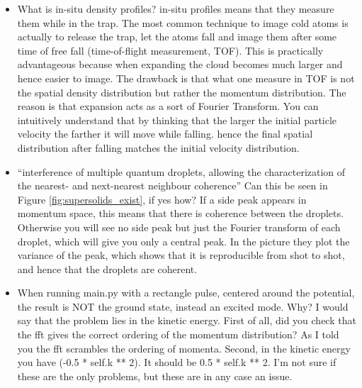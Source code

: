 \begin{itemize}
    \item What is in-situ density profiles?
    {\color{red}
        in-situ profiles means that they measure them while in the trap.
        The most common technique to image cold atoms is actually to release the trap,
        let the atoms fall and image them after some time of free fall (time-of-flight measurement, TOF).
        This is practically advantageous because when expanding the cloud becomes much larger and hence easier to image.
        The drawback is that what one measure in TOF is not the spatial density distribution but rather
        the momentum distribution. The reason is that expansion acts as a sort of Fourier Transform.
        You can intuitively understand that by thinking that the larger the initial particle velocity
        the farther it will move while falling.
        hence the final spatial distribution after falling matches the initial velocity distribution.
    }

    \item ``interference of multiple quantum droplets, allowing the characterization of the nearest- and next-nearest
        neighbour coherence'' Can this be seen in Figure \ref{fig:supersolids_exist}, if yes how?
    {\color{red}
        If a side peak appears in momentum space, this means that there is coherence between the droplets.
        Otherwise you will see no side peak but just the Fourier transform of each droplet,
        which will give you only a central peak. In the picture they plot the variance of the peak,
        which shows that it is reproducible from shot to shot, and hence that the droplets are coherent.
    }

    \item When running main.py with a rectangle pulse, centered around the potential,
        the result is NOT the ground state, instead an excited mode. Why?
    {\color{red}
        I would say that the problem lies in the kinetic energy.
        First of all, did you check that the fft gives the correct ordering of the momentum distribution?
        As I told you the fft scrambles the ordering of momenta.
        Second, in the kinetic energy you have (-0.5 * self.k ** 2).
        It should be 0.5 * self.k ** 2.
        I'm not sure if these are the only problems, but these are in any case an issue.
    }

\end{itemize}


